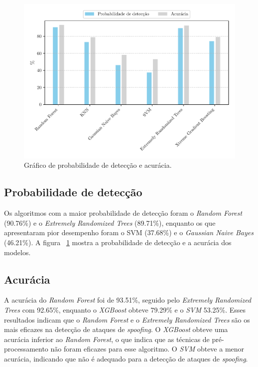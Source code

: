 \documentclass[12pt]{article}
\begin{document}
\begin{figure}[!ht]
  \centering
  \includegraphics[width=1\linewidth]{../plot_accuracy_and_tpr.pdf}
  \caption{Gráfico de probabilidade de detecção e acurácia.}
  \label{fig:accuracy_and_tpr}
\end{figure}

\subsection{Probabilidade de detecção}
Os algoritmos com a maior probabilidade de detecção
foram o \textit{Random Forest} (90.76\%) e o \textit{Extremely Randomized Trees} (89.71\%),
enquanto os que apresentaram pior desempenho foram o SVM (37.68\%) 
e o \textit{Gaussian Naive Bayes} (46.21\%).
A figura ~\ref{fig:accuracy_and_tpr} mostra a probabilidade de detecção
e a acurácia dos modelos.

\subsection{Acurácia}
A acurácia do \textit{Random Forest} foi de 93.51\%,
seguido pelo \textit{Extremely Randomized Trees} com 92.65\%,
enquanto o \textit{XGBoost} obteve 79.29\% e o \textit{SVM} 53.25\%.
Esses resultados indicam que o \textit{Random Forest}
e o \textit{Extremely Randomized Trees}
são os mais eficazes na detecção de ataques de \textit{spoofing}.
O \textit{XGBoost} obteve uma acurácia inferior ao \textit{Random Forest},
o que indica que as técnicas de pré-processamento
não foram eficazes para esse algoritmo.
O \textit{SVM} obteve a menor acurácia, indicando que não é adequado
para a detecção de ataques de \textit{spoofing}.
\end{document}
